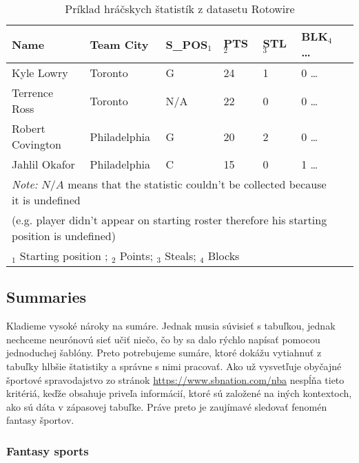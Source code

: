 \begin{table}[bh!]
    \begin{tabular}{lllllll}
        \toprule
        Name             & Team City    & S\_POS$_1$ & PTS$_2$ & STL$_3$ & BLK$_4$        \dots \\
        \midrule
        Kyle Lowry       & Toronto      & G         & 24  & 1   & 0       \dots \\
        Terrence Ross    & Toronto      & N/A       & 22  & 0   & 0        \dots \\
        Robert Covington & Philadelphia & G         & 20  & 2   & 0        \dots \\
        Jahlil Okafor    & Philadelphia & C         & 15  & 0   & 1        \dots \\
        \bottomrule
        \multicolumn{6}{l}{\footnotesize \textit{Note:} $N/A$ means that the statistic couldn't be collected because it is undefined} \\
        \multicolumn{6}{l}{\footnotesize (e.g. player didn't appear on starting roster therefore his starting position is undefined)} \\
        \multicolumn{6}{l}{\footnotesize $_1$ Starting position ; $_2$ Points; $_3$ Steals; $_4$ Blocks}
    \end{tabular}
    \caption{Príklad hráčskych štatistík z datasetu Rotowire}\label{tab_player_stats}
\end{table}

\subsection{Summaries}

Kladieme vysoké nároky na sumáre. Jednak musia súvisieť s tabuľkou, jednak nechceme neurónovú sieť učiť niečo, čo by sa dalo rýchlo napísať pomocou jednoduchej šablóny. Preto potrebujeme sumáre, ktoré dokážu vytiahnuť z tabuľky hlbšie štatistiky a správne s nimi pracovať. Ako už vysvetľuje \citep{wiseman2017} obyčajné športové spravodajstvo zo stránok \url{https://www.sbnation.com/nba} nespĺňa tieto kritériá, keďže obsahuje priveľa informácií, ktoré sú založené na iných kontextoch, ako sú dáta v zápasovej tabuľke. Práve preto je zaujímavé sledovať fenomén fantasy športov.


\subsubsection{Fantasy sports}

